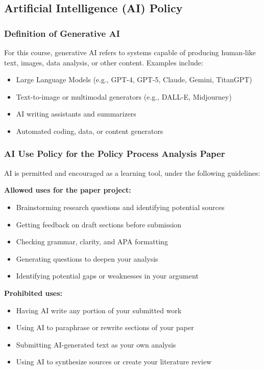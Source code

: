 \documentclass[12pt]{article}     %
\begin{document}
\subsection*{Artificial Intelligence (AI) Policy}

\subsubsection*{Definition of Generative AI}

\noindent For this course, generative AI refers to systems capable of producing human-like text, images, data analysis, or other content. Examples include:

\begin{itemize}
    \item Large Language Models (e.g., GPT-4, GPT-5, Claude, Gemini, TitanGPT)
    \item Text-to-image or multimodal generators (e.g., DALL-E, Midjourney)
    \item AI writing assistants and summarizers
    \item Automated coding, data, or content generators
\end{itemize}

\subsubsection*{AI Use Policy for the Policy Process Analysis Paper}

AI is permitted and encouraged as a learning tool, under the following guidelines:

\textbf{Allowed uses for the paper project:}
\begin{itemize}
    \item Brainstorming research questions and identifying potential sources
    \item Getting feedback on draft sections before submission
    \item Checking grammar, clarity, and APA formatting
    \item Generating questions to deepen your analysis
    \item Identifying potential gaps or weaknesses in your argument
\end{itemize}

\textbf{Prohibited uses:}
\begin{itemize}
    \item Having AI write any portion of your submitted work
    \item Using AI to paraphrase or rewrite sections of your paper
    \item Submitting AI-generated text as your own analysis
    \item Using AI to synthesize sources or create your literature review
\end{itemize}
\end{document}

